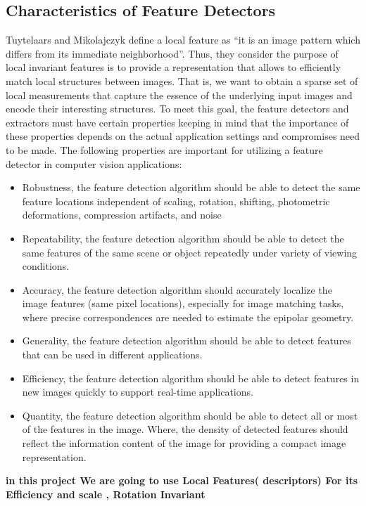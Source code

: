 \subsection{Characteristics of Feature Detectors}
Tuytelaars and Mikolajczyk \cite{MM} define a local feature as “it is an image pattern
which differs from its immediate neighborhood”. Thus, they consider the purpose of
local invariant features is to provide a representation that allows to efficiently match
local structures between images. That is, we want to obtain a sparse set of local
measurements that capture the essence of the underlying input images and encode
their interesting structures. To meet this goal, the feature detectors and extractors
must have certain properties keeping in mind that the importance of these properties
depends on the actual application settings and compromises need to be made. The
following properties are important for utilizing a feature detector in computer vision
applications:
\begin{itemize}
\item Robustness, the feature detection algorithm should be able to detect the same feature
locations independent of scaling, rotation, shifting, photometric deformations,
compression artifacts, and noise
\item Repeatability, the feature detection algorithm should be able to detect the same
features of the same scene or object repeatedly under variety of viewing conditions.
\item Accuracy, the feature detection algorithm should accurately localize the image
features (same pixel locations), especially for image matching tasks, where precise
correspondences are needed to estimate the epipolar geometry.
\item Generality, the feature detection algorithm should be able to detect features that
can be used in different applications.
\item Efficiency, the feature detection algorithm should be able to detect features in new
images quickly to support real-time applications.
\item Quantity, the feature detection algorithm should be able to detect all or most of the
features in the image. Where, the density of detected features should reflect the
information content of the image for providing a compact image representation.
\end{itemize}

\textbf{in this project We are going to use Local Features( descriptors) For its Efficiency and scale , Rotation  Invariant }\\
